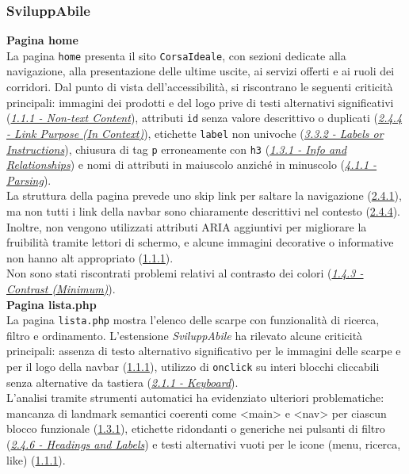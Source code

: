\subsubsection{SviluppAbile}
\noindent \textbf{Pagina home}\\
La pagina \texttt{home} presenta il sito \texttt{CorsaIdeale}, con sezioni dedicate alla navigazione, alla presentazione delle ultime uscite, ai servizi offerti e ai ruoli dei corridori. Dal punto di vista dell’accessibilità, si riscontrano le seguenti criticità principali: immagini dei prodotti e del logo prive di testi alternativi significativi ({\hyperref[wcag:1.1.1]{\textit{1.1.1 - Non-text Content}}}), attributi \texttt{id} senza valore descrittivo o duplicati ({\hyperref[wcag:2.4.4]{\textit{2.4.4 - Link Purpose (In Context)}}}), etichette \texttt{label} non univoche ({\hyperref[wcag:3.3.2]{\textit{3.3.2 - Labels or Instructions}}}), chiusura di tag \texttt{p} erroneamente con \texttt{h3} ({\hyperref[wcag:1.3.1]{\textit{1.3.1 - Info and Relationships}}}) e nomi di attributi in maiuscolo anziché in minuscolo ({\hyperref[wcag:4.1.1]{\textit{4.1.1 - Parsing}}}).\\
La struttura della pagina prevede uno skip link per saltare la navigazione ({\hyperref[wcag:2.4.1]{2.4.1}}), ma non tutti i link della navbar sono chiaramente descrittivi nel contesto ({\hyperref[wcag:2.4.4]{2.4.4}}). Inoltre, non vengono utilizzati attributi ARIA aggiuntivi per migliorare la fruibilità tramite lettori di schermo, e alcune immagini decorative o informative non hanno alt appropriato ({\hyperref[wcag:1.1.1]{1.1.1}}).\\
Non sono stati riscontrati problemi relativi al contrasto dei colori ({\hyperref[wcag:1.4.3]{\textit{1.4.3 - Contrast (Minimum)}}}).\\

\noindent \textbf{Pagina lista.php}\\
La pagina \texttt{lista.php} mostra l’elenco delle scarpe con funzionalità di ricerca, filtro e ordinamento. 
L’estensione \textit{SviluppAbile} ha rilevato alcune criticità principali: assenza di testo alternativo significativo per le immagini delle scarpe e per il logo della navbar ({\hyperref[wcag:1.1.1]{1.1.1}}), utilizzo di \texttt{onclick} su interi blocchi cliccabili senza alternative da tastiera ({\hyperref[wcag:2.1.1]{\textit{2.1.1 - Keyboard}}}).\\
L’analisi tramite strumenti automatici ha evidenziato ulteriori problematiche: mancanza di landmark semantici coerenti come <main> e <nav> per ciascun blocco funzionale ({\hyperref[wcag:1.3.1]{1.3.1}}), etichette ridondanti o generiche nei pulsanti di filtro ({\hyperref[wcag:2.4.6]{\textit{2.4.6 - Headings and Labels}}}) e testi alternativi vuoti per le icone (menu, ricerca, like) ({\hyperref[wcag:1.1.1]{1.1.1}}).\\

